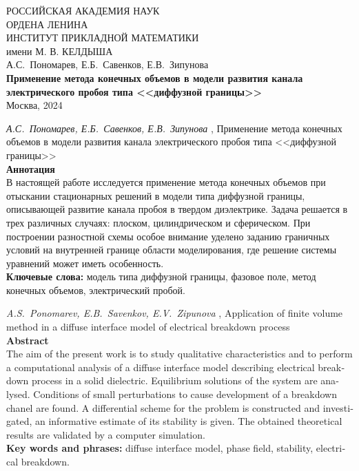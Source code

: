 \documentclass[a4paper,12pt]{article}
\theoremstyle{plain}
\theoremstyle{remark}
\newcommand{\PreprintTitle}{
	Применение метода конечных объемов в модели развития канала электрического пробоя типа <<диффузной границы>>
}
\newcommand{\PreprintTitleEnglish}{
	Application of finite volume method in a diffuse interface model of electrical breakdown process
}
\newcommand{\PreprintAuthors}{
	А.С.~Пономарев, Е.Б.~Савенков, Е.В.~Зипунова
}
\newcommand{\PreprintAuthorsEnglish}{
	A.S.~Ponomarev, E.B.~Savenkov, E.V.~Zipunova
}
\begin{document}
\begin{titlepage}

\begin{center}
	РОССИЙСКАЯ АКАДЕМИЯ НАУК \\
	ОРДЕНА ЛЕНИНА \\
	ИНСТИТУТ ПРИКЛАДНОЙ МАТЕМАТИКИ \\
	имени М. В. КЕЛДЫША \\

	\vspace*{60mm}
	\Large{\PreprintAuthors} \\
	\vspace*{20mm}
	\textbf{\large \PreprintTitle} \\
	\vspace*{110mm}
	\Large{Москва, 2024}
	\vspace*{-50mm}
\end{center}

\end{titlepage}

\setcounter{page}{2}

\thispagestyle{empty}

\noindent \emph{\PreprintAuthors}, \PreprintTitle \\[3mm]
\textbf{Аннотация} \\
{
	\small
	В настоящей работе исследуется применение метода конечных объемов при отыскании стационарных решений в модели типа диффузной границы, описывающей развитие канала пробоя в твердом диэлектрике. Задача решается в трех различных случаях: плоском, цилиндрическом и сферическом. При построении разностной схемы особое внимание уделено заданию граничных условий на внутренней границе области моделирования, где решение системы уравнений может иметь особенность. \\[3mm]
	\textbf{Ключевые слова:} модель типа диффузной границы, фазовое поле, метод конечных объемов, электрический пробой. \\[5mm]
}
\begin{otherlanguage}{english}
\emph{\PreprintAuthorsEnglish}, \PreprintTitleEnglish \\[3mm]
\textbf{Abstract} \\
{
	\small
	The aim of the present work is to study qualitative characteristics and to perform a computational analysis of a diffuse interface model describing electrical breakdown process in a solid dielectric. Equilibrium solutions of the system are analysed. Conditions of small perturbations to cause development of a breakdown chanel are found. A differential scheme for the problem is constructed and investigated, an informative estimate of its stability is given. The obtained theoretical results are validated by a computer simulation. \\[3mm]
	\textbf{Key words and phrases:} diffuse interface model, phase field, stability, electrical breakdown. \\[5mm]
}
\end{otherlanguage}

\clearpage







\clearpage
\printbibliography

\clearpage
\tableofcontents
\end{document}
